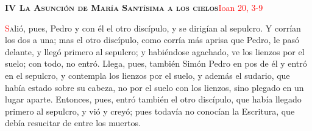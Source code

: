 \noindent\textbf{\textsc{IV La Asunción de María Santísima a los cielos}}\hfill\textcolor{red}{Ioan 20, 3-9}

\vspace{0.25em}

\lettrine[lines=2]{\textcolor{red}{S}}alió, pues, Pedro y con él el otro discípulo, y se dirigían al sepulcro. Y corrían los dos a una; mas el otro
discípulo, como corría más aprisa que Pedro, le pasó delante, y llegó primero al sepulcro; y habiéndose agachado, ve los lienzos por el suelo; con
todo, no entró. Llega, pues, también Simón Pedro en pos de él y entró en el sepulcro, y contempla los lienzos por el suelo, y además el sudario, que 
había estado sobre su cabeza, no por el suelo con los lienzos, sino plegado en un lugar aparte. Entonces, pues, entró también el otro discípulo,
que había llegado primero al sepulcro, y vió y creyó; pues todavía no conocían la Escritura, que debía resucitar de entre los muertos.